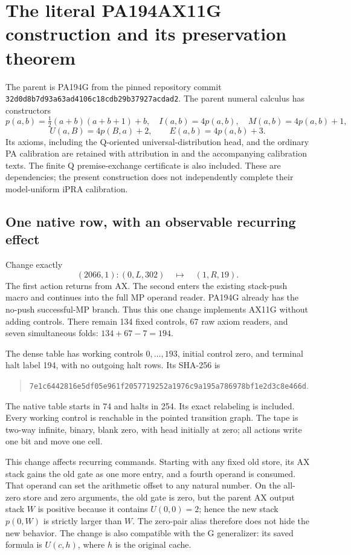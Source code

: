 \section{The literal PA194AX11G construction and its preservation theorem}

The parent is PA194G from the pinned repository commit
\nolinkurl{32d0d8b7d93a63ad4106c18cdb29b37927acdad2}.
The parent numeral calculus has constructors
\[
p(a,b)=\tfrac12(a+b)(a+b+1)+b,\quad I(a,b)=4p(a,b),\quad
M(a,b)=4p(a,b)+1,
\]
\[
U(a,B)=4p(B,a)+2,\qquad E(a,b)=4p(a,b)+3.
\]
Its axioms, including the Q-oriented universal-distribution head, and the
ordinary PA calibration are retained with attribution in
 and the accompanying
calibration texts. The finite Q premise-exchange certificate is also included.
These are dependencies; the present construction does not independently
complete their model-uniform iPRA calibration.

\subsection{One native row, with an observable recurring effect}

Change exactly
\[
 (2066,1):(0,L,302)\quad\longmapsto\quad(1,R,19).
\]
The first action returns from AX. The second enters the existing stack-push
macro and continues into the full MP operand reader. PA194G already has the
no-push successful-MP branch. Thus this one change implements AX11G without
adding controls. There remain 134 fixed controls, 67 raw axiom readers, and
seven simultaneous folds: $134+67-7=194$.

The dense table has working controls $0,\ldots,193$, initial control zero,
and terminal halt label 194, with no outgoing halt rows. Its SHA-256 is
\begin{quote}\small
\nolinkurl{7e1c6442816e5df05e961f2057719252a1976c9a195a786978bf1e2d3c8e466d}.
\end{quote}
The native table starts in 74 and halts in 254. Its exact relabeling is
included. Every working control is reachable in the pointed transition graph.
The tape is two-way infinite, binary, blank zero, with head initially at zero;
all actions write one bit and move one cell.

This change affects recurring commands. Starting with any fixed old store,
its AX stack gains the old gate as one more entry, and a fourth operand is
consumed. That operand can set the arithmetic offset to any natural number.
On the all-zero store and zero arguments, the old gate is zero, but the
parent AX output stack $W$ is positive because it contains $U(0,0)=2$; hence the new stack
$p(0,W)$ is strictly larger than $W$. The zero-pair alias therefore does not
hide the new behavior. The change is also compatible with the G generalizer:
its saved formula is $U(c,h)$, where $h$ is the original cache.

